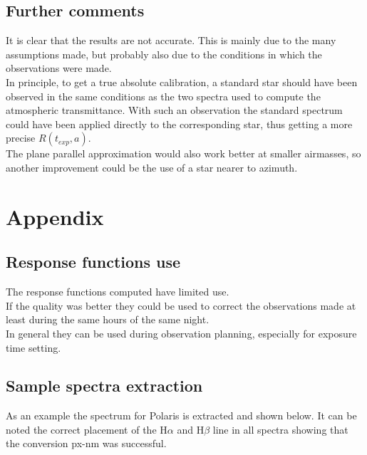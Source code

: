 \documentclass[a4paper]{article}
\begin{document}
\begin{multicols}{2}
		\subsection{Further comments}
			It is clear that the results are not accurate. This is mainly due to the many assumptions made, but probably also due to the conditions in which the observations were made.\\
			
			In principle, to get a true absolute calibration, a standard star should have been observed in the same conditions as the two spectra used to compute the atmospheric transmittance. With such an observation the standard spectrum could have been applied directly to the corresponding star, thus getting a more precise $R(t_{exp}, a)$.\\
			
			The plane parallel approximation would also work better at smaller airmasses, so another improvement could be the use of a star nearer to azimuth.
			
	\end{multicols}
	
	\newpage
	\section{Appendix}
		\subsection{Response functions use}
			The response functions computed have limited use.\\
			If the quality was better they could be used to correct the observations made at least during the same hours of the same night.\\
			In general they can be used during observation planning, especially for exposure time setting.\\
			
		\subsection{Sample spectra extraction}
		As an example the spectrum for Polaris is extracted and shown below.
		It can be noted the correct placement of the H$\alpha$ and H$\beta$ line in all spectra showing that the conversion px-nm was successful.\\
		
\end{document}
